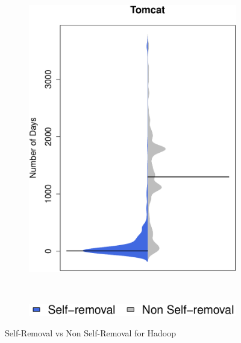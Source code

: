 \begin{figure}[t]
\begin{subfigure}[b]{0.20\textwidth}
	 		\includegraphics[width=\textwidth]{figures/test/tomcat_update.pdf}
	 		\label{fig:removal_comparison_tomcat} 
	 	\end{subfigure}
	 	
	 	~
	 	~
	 	~
	\begin{subfigure}[b]{0.25\textwidth}
		\includegraphics[width=\textwidth]{figures/test/legend.pdf}
	\end{subfigure}
	\caption{Self-Removal vs Non Self-Removal for Hadoop}
	 
\end{figure}





